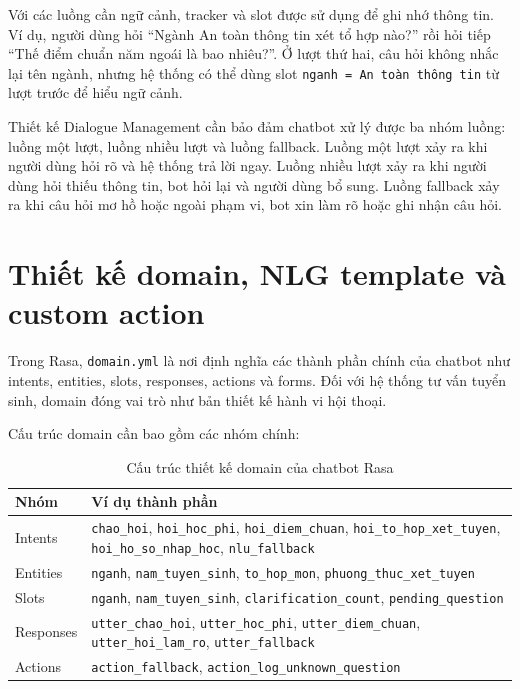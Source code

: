 \documentclass[12pt,a4paper]{report}
\begin{document}
Với các luồng cần ngữ cảnh, tracker và slot được sử dụng để ghi nhớ thông tin. Ví dụ, người dùng hỏi ``Ngành An toàn thông tin xét tổ hợp nào?'' rồi hỏi tiếp ``Thế điểm chuẩn năm ngoái là bao nhiêu?''. Ở lượt thứ hai, câu hỏi không nhắc lại tên ngành, nhưng hệ thống có thể dùng slot \texttt{nganh = An toàn thông tin} từ lượt trước để hiểu ngữ cảnh.

Thiết kế Dialogue Management cần bảo đảm chatbot xử lý được ba nhóm luồng: luồng một lượt, luồng nhiều lượt và luồng fallback. Luồng một lượt xảy ra khi người dùng hỏi rõ và hệ thống trả lời ngay. Luồng nhiều lượt xảy ra khi người dùng hỏi thiếu thông tin, bot hỏi lại và người dùng bổ sung. Luồng fallback xảy ra khi câu hỏi mơ hồ hoặc ngoài phạm vi, bot xin làm rõ hoặc ghi nhận câu hỏi.


\section{Thiết kế domain, NLG template và custom action}

Trong Rasa, \texttt{domain.yml} là nơi định nghĩa các thành phần chính của chatbot như intents, entities, slots, responses, actions và forms. Đối với hệ thống tư vấn tuyển sinh, domain đóng vai trò như bản thiết kế hành vi hội thoại.

Cấu trúc domain cần bao gồm các nhóm chính:

\begin{table}[H]
\centering
\begin{tabular}{|p{3.5cm}|p{9cm}|}
\hline
\textbf{Nhóm} & \textbf{Ví dụ thành phần} \\
\hline
Intents & \texttt{chao\_hoi}, \texttt{hoi\_hoc\_phi}, \texttt{hoi\_diem\_chuan}, \texttt{hoi\_to\_hop\_xet\_tuyen}, \texttt{hoi\_ho\_so\_nhap\_hoc}, \texttt{nlu\_fallback} \\
\hline
Entities & \texttt{nganh}, \texttt{nam\_tuyen\_sinh}, \texttt{to\_hop\_mon}, \texttt{phuong\_thuc\_xet\_tuyen} \\
\hline
Slots & \texttt{nganh}, \texttt{nam\_tuyen\_sinh}, \texttt{clarification\_count}, \texttt{pending\_question} \\
\hline
Responses & \texttt{utter\_chao\_hoi}, \texttt{utter\_hoc\_phi}, \texttt{utter\_diem\_chuan}, \texttt{utter\_hoi\_lam\_ro}, \texttt{utter\_fallback} \\
\hline
Actions & \texttt{action\_fallback}, \texttt{action\_log\_unknown\_question} \\
\hline
\end{tabular}
\caption{Cấu trúc thiết kế domain của chatbot Rasa}
\label{tab:rasa-domain-design}
\end{table}
\end{document}
